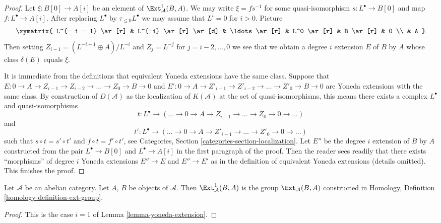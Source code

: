 \begin{proof}
Let $\xi : B[0] \to A[i]$ be an element of $\Ext^i_\mathcal{A}(B, A)$.
We may write $\xi = f s^{-1}$ for some quasi-isomorphism
$s : L^\bullet \to B[0]$ and map $f : L^\bullet \to A[i]$.
After replacing $L^\bullet$ by $\tau_{\leq 0}L^\bullet$ we may assume
that $L^i = 0$ for $i > 0$. Picture
$$
\xymatrix{
L^{- i - 1} \ar[r] & L^{-i} \ar[r] \ar[d] & \ldots \ar[r] &
L^0 \ar[r] & B \ar[r] & 0 \\
& A
}
$$
Then setting $Z_{i - 1} = (L^{- i + 1} \oplus A)/L^{-i}$ and
$Z_j = L^{-j}$ for $j = i - 2, \ldots, 0$ we see that we obtain a
degree $i$ extension $E$ of $B$ by $A$ whose class $\delta(E)$ equals
$\xi$.

\medskip\noindent
It is immediate from the definitions that equivalent Yoneda extensions
have the same class. Suppose that
$E : 0 \to A \to Z_{i - 1} \to Z_{i - 2} \to \ldots \to Z_0 \to B \to 0$ and
$E' : 0 \to A \to Z'_{i - 1} \to Z'_{i - 2} \to \ldots \to Z'_0 \to B \to 0$
are Yoneda extensions with the same class.
By construction of $D(\mathcal{A})$ as the localization
of $K(\mathcal{A})$ at the set of quasi-isomorphisms, this means there
exists a complex $L^\bullet$ and quasi-isomorphisms
$$
t : L^\bullet \to
(\ldots \to 0 \to A \to Z_{i - 1} \to \ldots \to Z_0 \to 0 \to \ldots)
$$
and
$$
t' : L^\bullet \to
(\ldots \to 0 \to A \to Z'_{i - 1} \to \ldots \to Z'_0 \to 0 \to \ldots)
$$
such that $s \circ t = s' \circ t'$ and $f \circ t = f' \circ t'$, see
Categories, Section \ref{categories-section-localization}.
Let $E''$ be the degree $i$ extension of $B$ by $A$ constructed from
the pair $L^\bullet \to B[0]$ and $L^\bullet \to A[i]$ in the first
paragraph of the proof. Then the reader sees readily that there exists
``morphisms'' of degree $i$ Yoneda extensions $E'' \to E$ and $E'' \to E'$
as in the definition of equivalent Yoneda extensions (details omitted).
This finishes the proof.
\end{proof}

\begin{lemma}
\label{lemma-ext-1}
Let $\mathcal{A}$ be an abelian category. Let $A$, $B$ be objects
of $\mathcal{A}$. Then $\Ext^1_\mathcal{A}(B, A)$ is
the group $\Ext_\mathcal{A}(B, A)$ constructed in
Homology, Definition \ref{homology-definition-ext-group}.
\end{lemma}

\begin{proof}
This is the case $i = 1$ of
Lemma \ref{lemma-yoneda-extension}.
\end{proof}

